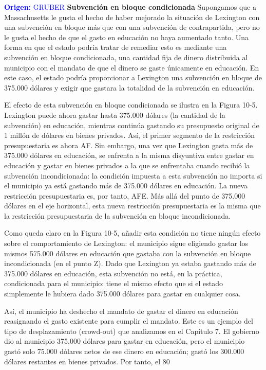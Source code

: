 \documentclass[10pt,a4paper]{article}
\begin{document}
\textcolor{blue}{\textbf{Origen:} GRUBER}
\textbf{Subvención en bloque condicionada}
Supongamos que a Massachusetts le gusta el hecho de haber mejorado la situación de Lexington con una subvención en bloque más que con una subvención de contrapartida, pero no le gusta el hecho de que el gasto en educación no haya aumentado tanto. Una forma en que el estado podría tratar de remediar esto es mediante una subvención en bloque condicionada, una cantidad fija de dinero distribuida al municipio con el mandato de que el dinero se gaste únicamente en educación. En este caso, el estado podría proporcionar a Lexington una subvención en bloque de 375.000 dólares y exigir que gastara la totalidad de la subvención en educación.

El efecto de esta subvención en bloque condicionada se ilustra en la Figura 10-5. Lexington puede ahora gastar hasta 375.000 dólares (la cantidad de la subvención) en educación, mientras continúa gastando su presupuesto original de 1 millón de dólares en bienes privados. Así, el primer segmento de la restricción presupuestaria es ahora AF. Sin embargo, una vez que Lexington gasta más de 375.000 dólares en educación, se enfrenta a la misma disyuntiva entre gastar en educación y gastar en bienes privados a la que se enfrentaba cuando recibió la subvención incondicionada: la condición impuesta a esta subvención no importa si el municipio ya está gastando más de 375.000 dólares en educación. La nueva restricción presupuestaria es, por tanto, AFE. Más allá del punto de 375.000 dólares en el eje horizontal, esta nueva restricción presupuestaria es la misma que la restricción presupuestaria de la subvención en bloque incondicionada.

Como queda claro en la Figura 10-5, añadir esta condición no tiene ningún efecto sobre el comportamiento de Lexington: el municipio sigue eligiendo gastar los mismos 575.000 dólares en educación que gastaba con la subvención en bloque incondicionada (en el punto Z). Dado que Lexington ya estaba gastando más de 375.000 dólares en educación, esta subvención no está, en la práctica, condicionada para el municipio: tiene el mismo efecto que si el estado simplemente le hubiera dado 375.000 dólares para gastar en cualquier cosa.

Así, el municipio ha deshecho el mandato de gastar el dinero en educación reasignando el gasto existente para cumplir el mandato. Este es un ejemplo del tipo de desplazamiento (crowd-out) que analizamos en el Capítulo 7. El gobierno dio al municipio 375.000 dólares para gastar en educación, pero el municipio gastó solo 75.000 dólares netos de ese dinero en educación; gastó los 300.000 dólares restantes en bienes privados. Por tanto, el 80 %
\end{document}
